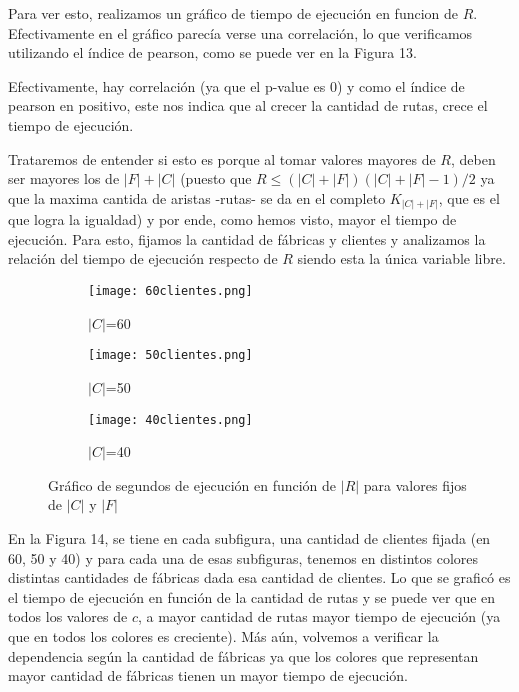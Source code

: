 \documentclass[A4paper,oneside,fleqn,11pt]{article}
\theoremstyle{definition}
\begin{document}
 Para ver esto, realizamos un gráfico de tiempo de ejecución en funcion de $R$. Efectivamente en el gráfico parecía verse una correlación, lo que verificamos utilizando el índice de pearson, como se puede ver en la Figura 13.


Efectivamente, hay correlación (ya que el p-value es 0) y como el índice de pearson en positivo, este nos indica que al crecer la cantidad de rutas, crece el tiempo de ejecución. 

Trataremos de entender si esto es porque al tomar valores mayores de $R$, deben ser mayores los de $|F|+|C|$ (puesto que $R \leq (|C|+|F|)(|C|+|F|-1)/2$ ya que la maxima cantida de aristas -rutas- se da en el completo $K_{|C|+|F|}$, que es el que logra la igualdad) y por ende, como hemos visto, mayor el tiempo de ejecución. Para esto, fijamos la cantidad de fábricas y clientes y analizamos la relación del tiempo de ejecución respecto de $R$ siendo esta la única variable libre.

\vspace{15mm}

\begin{figure}[h!] %
    \begin{subfigure}[b]{0.3\textwidth}
        \texttt{[image: 60clientes.png]}
        \caption[center]{$|C|$=60}
        \label{ni se pa que sirve esto}
    \end{subfigure}
    \begin{subfigure}[b]{0.3\textwidth}
        \texttt{[image: 50clientes.png]}
        \caption{$|C|$=50}
        \label{ni se pa que sirve esto}
    \end{subfigure}
	\begin{subfigure}[b]{0.3\textwidth}
        \texttt{[image: 40clientes.png]}
        \caption{$|C|$=40}
        \label{ni se pa que sirve esto}
    \end{subfigure}    
    \caption{Gráfico de segundos de ejecución en función de $|R|$ para valores fijos de $|C|$ y $|F|$}
\end{figure}

En la Figura 14, se tiene en cada subfigura, una cantidad de clientes fijada (en 60, 50 y 40) y para cada una de esas subfiguras, tenemos en distintos colores distintas cantidades de fábricas dada esa cantidad de clientes. Lo que se graficó es el tiempo de ejecución en función de la cantidad de rutas y se puede ver que en todos los valores de $c$, a mayor cantidad de rutas mayor tiempo de ejecución (ya que en todos los colores es creciente). Más aún, volvemos a verificar la dependencia según la cantidad de fábricas ya que los colores que representan mayor cantidad de fábricas  tienen un mayor tiempo de ejecución.
\end{document}

